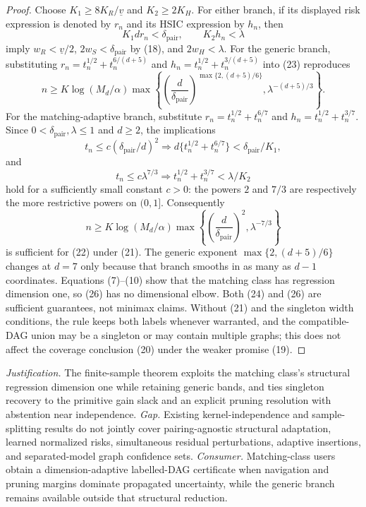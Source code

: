 \documentclass{article}
\begin{document}
\begin{proof}
Choose \(K_1\ge8K_R/\underline v\) and \(K_2\ge2K_H\). For either branch, if its displayed risk expression is denoted by \(r_n\) and its HSIC expression by \(h_n\), then
\[
 K_1d r_n<\delta_{\mathrm{pair}},
 \qquad K_2h_n<\lambda \tag{23}
\]
imply \(w_R<\underline v/2\), \(2w_S<\delta_{\mathrm{pair}}\) by (18), and \(2w_H<\lambda\). For the generic branch, substituting \(r_n=t_n^{1/2}+t_n^{6/(d+5)}\) and \(h_n=t_n^{1/2}+t_n^{3/(d+5)}\) into (23) reproduces
\[
 n\ge K\log(M_d/\alpha)
 \max\left\{
 \left(\frac d{\delta_{\mathrm{pair}}}\right)^{\max\{2,(d+5)/6\}},
 \lambda^{-(d+5)/3}
 \right\}. \tag{24}
\]
For the matching-adaptive branch, substitute \(r_n=t_n^{1/2}+t_n^{6/7}\) and \(h_n=t_n^{1/2}+t_n^{3/7}\). Since \(0<\delta_{\mathrm{pair}},\lambda\le1\) and \(d\ge2\), the implications
\[
 t_n\le c(\delta_{\mathrm{pair}}/d)^2
 \Longrightarrow d\{t_n^{1/2}+t_n^{6/7}\}<\delta_{\mathrm{pair}}/K_1,
\]
and
\[
 t_n\le c\lambda^{7/3}
 \Longrightarrow t_n^{1/2}+t_n^{3/7}<\lambda/K_2 \tag{25}
\]
hold for a sufficiently small constant \(c>0\): the powers \(2\) and \(7/3\) are respectively the more restrictive powers on \((0,1]\). Consequently
\[
 n\ge K\log(M_d/\alpha)
 \max\left\{
 \left(\frac d{\delta_{\mathrm{pair}}}\right)^2,
 \lambda^{-7/3}
 \right\} \tag{26}
\]
is sufficient for (22) under (21). The generic exponent \(\max\{2,(d+5)/6\}\) changes at \(d=7\) only because that branch smooths in as many as \(d-1\) coordinates. Equations (7)--(10) show that the matching class has regression dimension one, so (26) has no dimensional elbow. Both (24) and (26) are sufficient guarantees, not minimax claims. Without (21) and the singleton width conditions, the rule keeps both labels whenever warranted, and the compatible-DAG union may be a singleton or may contain multiple graphs; this does not affect the coverage conclusion (20) under the weaker promise (19).
\end{proof}
\par\smallskip\noindent \textit{Justification.} The finite-sample theorem exploits the matching class's structural regression dimension one while retaining generic bands, and ties singleton recovery to the primitive gain slack and an explicit pruning resolution with abstention near independence. \textit{Gap.} Existing kernel-independence and sample-splitting results do not jointly cover pairing-agnostic structural adaptation, learned normalized risks, simultaneous residual perturbations, adaptive insertions, and separated-model graph confidence sets. \textit{Consumer.} Matching-class users obtain a dimension-adaptive labelled-DAG certificate when navigation and pruning margins dominate propagated uncertainty, while the generic branch remains available outside that structural reduction.
\end{document}
